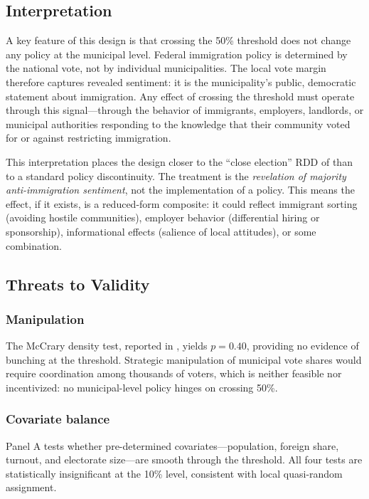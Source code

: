 \documentclass[12pt]{article}
\begin{document}
\subsection{Interpretation}

A key feature of this design is that crossing the 50\% threshold does not change any policy at the municipal level. Federal immigration policy is determined by the national vote, not by individual municipalities. The local vote margin therefore captures revealed sentiment: it is the municipality's public, democratic statement about immigration. Any effect of crossing the threshold must operate through this signal---through the behavior of immigrants, employers, landlords, or municipal authorities responding to the knowledge that their community voted for or against restricting immigration.

This interpretation places the design closer to the ``close election'' RDD of \citet{lee2008} than to a standard policy discontinuity. The treatment is the \textit{revelation of majority anti-immigration sentiment}, not the implementation of a policy. This means the effect, if it exists, is a reduced-form composite: it could reflect immigrant sorting (avoiding hostile communities), employer behavior (differential hiring or sponsorship), informational effects (salience of local attitudes), or some combination.

\subsection{Threats to Validity}

\subsubsection*{Manipulation} The McCrary density test, reported in , yields $p = 0.40$, providing no evidence of bunching at the threshold. Strategic manipulation of municipal vote shares would require coordination among thousands of voters, which is neither feasible nor incentivized: no municipal-level policy hinges on crossing 50\%.

\subsubsection*{Covariate balance}  Panel A tests whether pre-determined covariates---population, foreign share, turnout, and electorate size---are smooth through the threshold. All four tests are statistically insignificant at the 10\% level, consistent with local quasi-random assignment.
\end{document}
